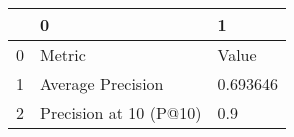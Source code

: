 \begin{tabular}{lll}
\toprule
{} &                       0 &         1 \\
\midrule
0 &                  Metric &     Value \\
1 &       Average Precision &  0.693646 \\
2 &  Precision at 10 (P@10) &       0.9 \\
\bottomrule
\end{tabular}
